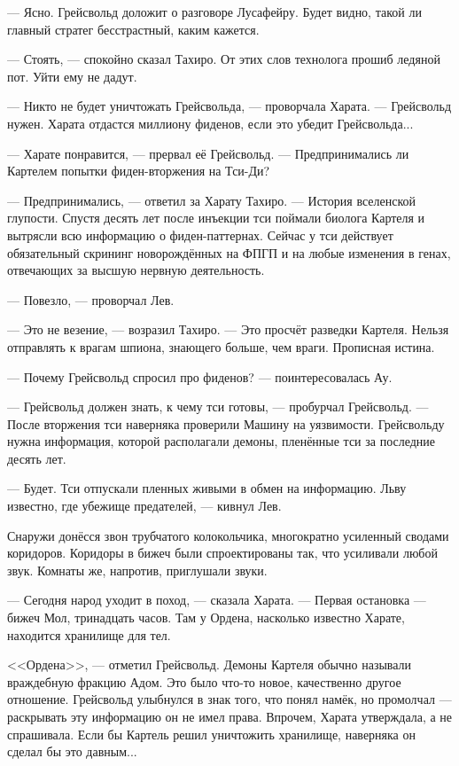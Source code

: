 --- Ясно.
Грейсвольд доложит о разговоре Лусафейру.
Будет видно, такой ли главный стратег бесстрастный, каким кажется.

--- Стоять, --- спокойно сказал Тахиро.
От этих слов технолога прошиб ледяной пот.
Уйти ему не дадут.

--- Никто не будет уничтожать Грейсвольда, --- проворчала Харата.
--- Грейсвольд нужен.
Харата отдастся миллиону фиденов, если это убедит Грейсвольда...

--- Харате понравится, --- прервал её Грейсвольд.
--- Предпринимались ли Картелем попытки фиден-вторжения на Тси-Ди?

--- Предпринимались, --- ответил за Харату Тахиро.
--- История вселенской глупости.
Спустя десять лет после инъекции тси поймали биолога Картеля и вытрясли всю информацию о фиден-паттернах.
Сейчас у тси действует обязательный скрининг новорождённых на ФПГП и на любые изменения в генах, отвечающих за высшую нервную деятельность.

--- Повезло, --- проворчал Лев.

--- Это не везение, --- возразил Тахиро.
--- Это просчёт разведки Картеля.
Нельзя отправлять к врагам шпиона, знающего больше, чем враги.
Прописная истина.

--- Почему Грейсвольд спросил про фиденов? --- поинтересовалась Ау.

--- Грейсвольд должен знать, к чему тси готовы, --- пробурчал Грейсвольд.
--- После вторжения тси наверняка проверили Машину на уязвимости.
Грейсвольду нужна информация, которой располагали демоны, пленённые тси за последние десять лет.

--- Будет.
Тси отпускали пленных живыми в обмен на информацию.
Льву известно, где убежище предателей, --- кивнул Лев.

Снаружи донёсся звон трубчатого колокольчика, многократно усиленный сводами коридоров.
Коридоры в бижеч были спроектированы так, что усиливали любой звук.
Комнаты же, напротив, приглушали звуки.

--- Сегодня народ уходит в поход, --- сказала Харата.
--- Первая остановка --- бижеч Мол, тринадцать часов.
Там у Ордена, насколько известно Харате, находится хранилище для тел.

<<Ордена>>, --- отметил Грейсвольд.
Демоны Картеля обычно называли враждебную фракцию Адом.
Это было что-то новое, качественно другое отношение.
Грейсвольд улыбнулся в знак того, что понял намёк, но промолчал --- раскрывать эту информацию он не имел права.
Впрочем, Харата утверждала, а не спрашивала.
Если бы Картель решил уничтожить хранилище, наверняка он сделал бы это давным...


